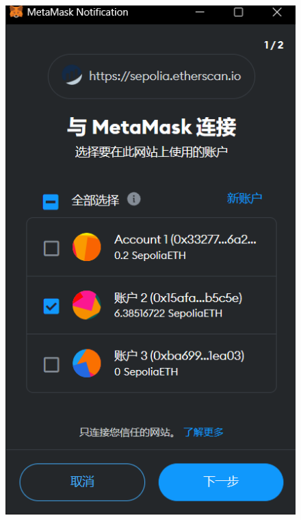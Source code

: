 \documentclass{beamer}
\begin{document}
\begin{frame}
\begin{columns}
\begin{column}{0.25\textwidth}
\begin{figure}
                \includegraphics[width=\textwidth]{s4.png}
            \end{figure}
        \end{column}
    \end{columns}

\end{frame}
\end{document}
